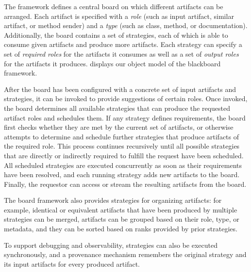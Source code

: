The framework defines a central board on which different artifacts can be arranged.
Each artifact is specified with a \emph{role} (such as input artifact, similar artifact, or method sender) and a \emph{type} (such as class, method, or documentation).
Additionally, the board contains a set of strategies, each of which is able to consume given artifacts and produce more artifacts.
Each strategy can specify a set of \emph{required roles} for the artifacts it consumes as well as a set of \emph{output roles} for the artifacts it produces.
 displays our object model of the blackboard framework.

After the board has been configured with a concrete set of input artifacts and strategies, it can be invoked to provide suggestions of certain roles.
Once invoked, the board determines all available strategies that can produce the requested artifact roles and schedules them.
If any strategy defines requirements, the board first checks whether they are met by the current set of artifacts, or otherwise attempts to determine and schedule further strategies that produce artifacts of the required role.
This process continues recursively until all possible strategies that are directly or indirectly required to fulfill the request have been scheduled.
All scheduled strategies are executed concurrently as soon as their requirements have been resolved, and each running strategy adds new artifacts to the board.
Finally, the requestor can access or stream the resulting artifacts from the board.

The board framework also provides strategies for organizing artifacts:
for example, identical or equivalent artifacts that have been produced by multiple strategies can be merged, artifacts can be grouped based on their role, type, or metadata, and they can be sorted based on ranks provided by prior strategies.

To support debugging and observability, strategies can also be executed synchronously, and a provenance mechanism remembers the original strategy and its input artifacts for every produced artifact.

